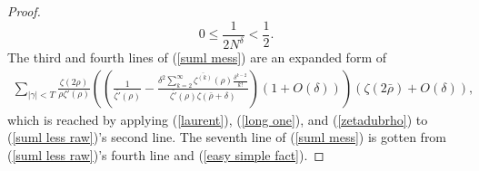 \documentclass[11pt,article]{amsart}
\numberwithin{equation}{section}
\numberwithin{equation}{section}
\numberwithin{lemma}{section}
\numberwithin{prop}{section}
\begin{document}
\begin{proof}
\begin{equation}
0\leq \frac{1}{2N^{\delta}}<\frac{1}{2}. \label{dlmf gen err 32}
\end{equation}
The third and fourth lines of (\ref{suml mess}) are an expanded form of
\begin{align}
\sum_{\left|\gamma\right|<T}\frac{\zeta(2\rho)}{\rho\zeta'(\rho)}\left(\left(\frac{1}{\overline{\zeta'}(\rho)}-\frac{\delta^{2}\sum_{k=2}^{\infty}\overline{\zeta^{(k)}}(\rho)\frac{\delta^{k-2}}{k!}}{\overline{\zeta'}(\rho)\zeta\left(\bar{\rho}+\delta\right)}\right)\left(1+O(\delta)\right)\right)\left(\zeta\left(2\bar{\rho}\right)+O(\delta)\right),
\end{align}
which is reached by applying (\ref{laurent}), (\ref{long one}), and (\ref{zetadubrho}) to (\ref{suml less raw})'s second line. The seventh line of (\ref{suml mess}) is gotten from (\ref{suml less raw})'s fourth line and (\ref{easy simple fact}). 



\end{proof}
\end{document}
